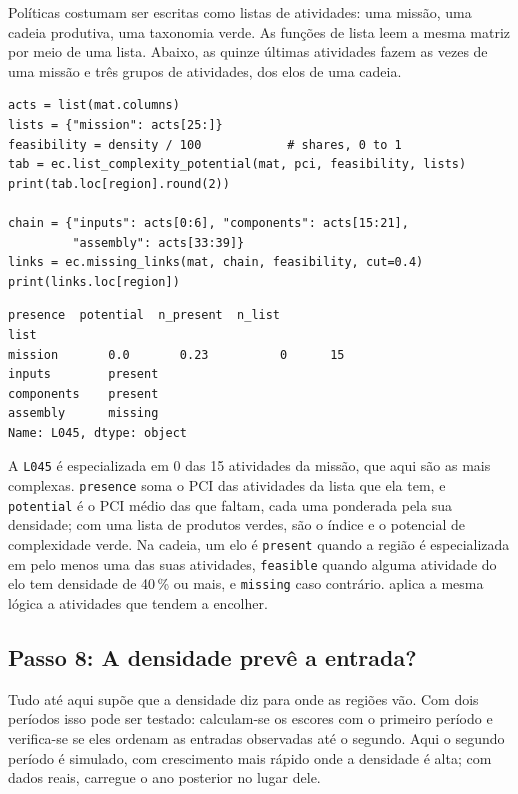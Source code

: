 Políticas costumam ser escritas como listas de atividades: uma
missão, uma cadeia produtiva, uma taxonomia verde. As funções de lista
leem a mesma matriz por meio de uma lista. Abaixo, as quinze últimas
atividades fazem as vezes de uma missão e três grupos de atividades, dos
elos de uma cadeia.

\begin{lstlisting}
acts = list(mat.columns)
lists = {"mission": acts[25:]}
feasibility = density / 100            # shares, 0 to 1
tab = ec.list_complexity_potential(mat, pci, feasibility, lists)
print(tab.loc[region].round(2))

chain = {"inputs": acts[0:6], "components": acts[15:21],
         "assembly": acts[33:39]}
links = ec.missing_links(mat, chain, feasibility, cut=0.4)
print(links.loc[region])
\end{lstlisting}
\begin{lstlisting}[language={}, numbers=none, backgroundcolor=\color{white}, frame=leftline, framerule=2pt, rulecolor=\color{noteborder}, xleftmargin=1.5em]
         presence  potential  n_present  n_list
list                                           
mission       0.0       0.23          0      15
inputs        present
components    present
assembly      missing
Name: L045, dtype: object
\end{lstlisting}

A \texttt{L045} é especializada em
0 das
15 atividades da missão,
que aqui são as mais complexas. \texttt{presence} soma o PCI das
atividades da lista que ela tem, e \texttt{potential} é o PCI médio das
que faltam, cada uma ponderada pela sua densidade; com uma
lista de produtos verdes, são o índice e o potencial de complexidade
verde. Na cadeia, um elo é \texttt{present} quando a região é
especializada em pelo menos uma das suas atividades, \texttt{feasible}
quando alguma atividade do elo tem densidade de 40\,\% ou mais, e
\texttt{missing} caso contrário.  aplica a mesma
lógica a atividades que tendem a encolher.

\subsection{Passo 8: A densidade prevê a entrada?}

Tudo até aqui supõe que a densidade diz para onde as regiões
vão. Com dois períodos isso pode ser testado: calculam-se os escores com
o primeiro período e verifica-se se eles ordenam as entradas observadas
até o segundo. Aqui o segundo período é simulado, com crescimento mais
rápido onde a densidade é alta; com dados reais, carregue o ano
posterior no lugar dele.

